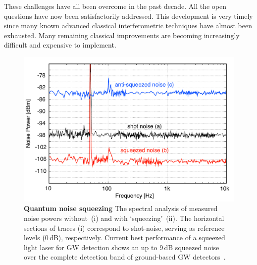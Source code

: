 These challenges have all been overcome in the past decade.  All the open questions have now been satisfactorily addressed.  This development is very timely since many known advanced classical interferometric techniques have almost been exhausted.  Many remaining classical improvements are becoming increasingly difficult and expensive to implement.

\begin{figure}
\centering
 \includegraphics[scale=.45]{./Sec_Optics/SqzAudio.pdf}
\caption{\textbf{Quantum noise squeezing}\; The spectral analysis of measured noise powers without~(i) and with `squeezing'~(ii). The horizontal sections of traces (i) correspond to shot-noise, serving as reference levels (0\,dB), respectively.  Current best performance of a squeezed light laser for GW detection shows an up to 9\,dB squeezed noise over the complete detection band of ground-based GW detectors~\cite{VahlbruchCQG2010}.}
\label{fig:SqzAudio}
\end{figure}



